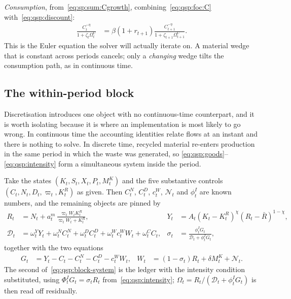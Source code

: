 \emph{Consumption}, from~\eqref{eq:sp:sum:Cgrowth}, combining~\eqref{eq:qsp:foc:C}
with~\eqref{eq:qsp:discount}:
\begin{align}
\frac{C_t^{-\eta}}{1+\zeta_t\Omega^C_t} &= \beta\left(1+r_{t+1}\right)\frac{C_{t+1}^{-\eta}}{1+\zeta_{t+1}\Omega^C_{t+1}} .
\label{eq:qsp:euler}
\end{align}
This is the Euler equation the solver will actually iterate on. A material wedge that is constant
across periods cancels; only a \emph{changing} wedge tilts the consumption path, as in continuous time.

\subsection{The within-period block}\label{sec:qsp:model:block}

Discretisation introduces one object with no continuous-time counterpart, and it is worth isolating
because it is where an implementation is most likely to go wrong. In continuous time the accounting
identities relate flows at an instant and there is nothing to solve. In discrete time, recycled
material re-enters production in the same period in which the waste was generated, so
\eqref{eq:qsp:goods}--\eqref{eq:qsp:intensity} form a simultaneous system inside the period.

Take the states $\left(K_t,S_t,X_t,P_t,M^K_t\right)$ and the five substantive controls
$\left(C_t,N_t,D_t,\varpi_t,K^R_t\right)$ as given. Then $C^N_t$, $C^D_t$, $c^W_t$, $\mathcal N_t$ and
$\phi^I_t$ are known numbers, and the remaining objects are pinned by
\begin{align}
R_t &= N_t+a^m_t\,\frac{\varpi_tW_tK^R_t}{\varpi_tW_t+K^R_t},
&
Y_t &= A_t\left(K_t-K^R_t\right)^{\chi}\left(R_t-\bar R\right)^{1-\chi},
\label{eq:qsp:block-defs}
\\
\mathcal D_t &= \omega^Y_tY_t+\omega^N_tC^N_t+\omega^D_tC^D_t+\omega^W_tc^W_tW_t+\omega^C_tC_t,
&
\sigma_t &= \frac{\phi^I_tG_t}{\mathcal D_t+\phi^I_tG_t},
\label{eq:qsp:block-D}
\end{align}
together with the two equations
\begin{align}
G_t &= Y_t-C_t-C^N_t-C^D_t-c^W_tW_t,
&
W_t &= \left(1-\sigma_t\right)R_t+\delta M^K_t+\mathcal N_t .
\label{eq:qsp:block-system}
\end{align}
The second of~\eqref{eq:qsp:block-system} is the ledger with the intensity condition substituted, using
$\Phi^I_tG_t=\sigma_tR_t$ from~\eqref{eq:qsp:intensity}; $\Omega_t=R_t/\left(\mathcal D_t+\phi^I_tG_t\right)$
is then read off residually.


